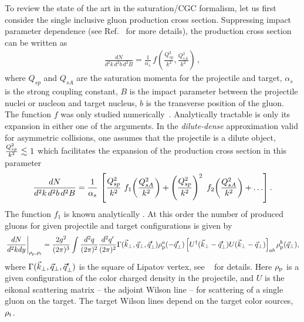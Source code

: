 To review the state of the art in the saturation/CGC formalism,   
let us first consider the single inclusive gluon production cross section. 
Suppressing impact parameter dependence (see Ref.~\cite{Kovchegov:2018jun} for more details), 
the production cross section can be written as \cite{Kovchegov:1996ty,Kovchegov:1997pc} 
 \begin{align}
   \frac{dN}{d^2 k \, d^2 b \, d^2 B} 
   = \frac{1}{\alpha_s} \, f \left( 
   \frac{Q_{sp}^2}{k^2},  	 
   \frac{Q_{sA}^2}{k^2}  	 
   \right)\, ,
 \end{align}
 where $Q_{sp}$ and $Q_{sA}$ are the saturation momenta 
 for the projectile and target, $\alpha_s$ is the strong coupling constant,
 $B$ is the impact parameter between the projectile nuclei or nucleon and target nucleus, $b$ is the transverse
 position of the gluon. 
 The function $f$ was only studied numerically~\cite{Krasnitz:1999wc,Krasnitz:2003jw,Lappi:2003bi,Blaizot:2010kh}. 
 Analytically tractable is only its expansion in either one of the arguments.
 In the {\it dilute-dense} approximation valid for asymmetric collisions, one assumes 
 that the projectile is a dilute object, $  \frac{Q_{sp}^2}{k^2} \lsim
 1$ which facilitates the expansion of the production cross section in this parameter
\begin{align}
  \frac{dN}{d^2 k \, d^2 b \, d^2 B} = \frac{1}{\alpha_s} \, \left[
     \frac{Q_{sp}^2}{k^2}
	  \ f_1 \! \left(  \frac{Q_{sA}^2}{k^2} \right) +
    \left(  \frac{Q_{sp}^2}{k^2} \right)^2 \ f_2 \! \left(  \frac{Q_{sA}^2}{k^2} \right) + \ldots \right].
  \label{Eq:SIP}
\end{align}
The function $f_1$ is known analytically 
\cite{Kovchegov:1998bi,Dumitru:2001ux}. 
At this order the number of produced gluons for  given projectile and target configurations is given by 
\begin{equation}
\left.\frac{dN}{d^{2}kdy}\right|_{\rho_{\rm p},\rho_{\rm t}}=\frac{2g^{2}}{(2\pi)^{3}}\int\frac{d^{2}q}{(2\pi)^{2}}\frac{d^{2}q'}{(2\pi)^{2}}\Gamma( \vec {k}_\perp , \vec {q}_\perp , \vec {q}_\perp ')\rho_{\rm p}^{a}(- \vec {q}_\perp ')\left[U^{\dagger}( \vec {k}_\perp - \vec {q}_\perp ')U( \vec {k}_\perp - \vec {q}_\perp )\right]_{ab}\rho_{\rm p}^{b}( \vec {q}_\perp ),
\label{eq:SIPc}
\end{equation}
where $\Gamma( \vec {k}_\perp , \vec {q}_\perp , \vec {q}_\perp ')$ is the square of Lipatov vertex, 
see \myref~\cite{Kovner:2018azs} for details. 
Here $\rho_{\rm p}$ is a given configuration of the color charged density in the projectile,
and $U$ is the eikonal scattering matrix -- the adjoint Wilson line -- for scattering of
a single gluon on the target.
The target Wilson lines depend on the target color sources, $\rho_{\rm t}$. 


